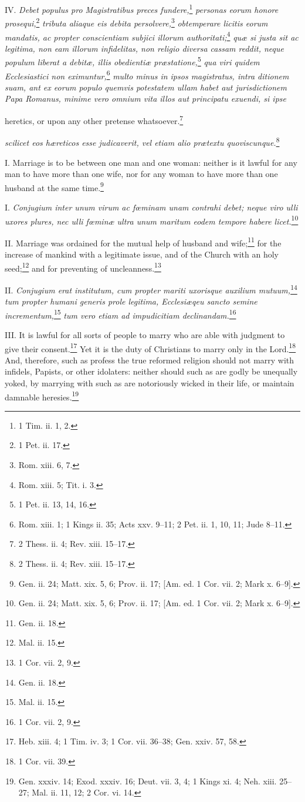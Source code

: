 IV. \emph{Debet populus pro Magistratibus preces fundere,}\footnote{1 Tim. ii. 1, 2.}\emph{ personas eorum honore prosequi,}\footnote{1 Pet. ii. 17.}\emph{ tributa aliaque eis debita persolvere,}\footnote{Rom. xiii. 6, 7.}\emph{ obtemperare licitis eorum mandatis, ac propter conscientiam subjici illorum authoritati;}\footnote{Rom. xiii. 5; Tit. i. 3.}\emph{ quæ si justa sit ac legitima, non eam illorum infidelitas, non religio diversa cassam reddit, neque populum liberat a debitæ, illis obedientiæ præstatione,}\footnote{1 Pet. ii. 13, 14, 16.}\emph{ qua viri quidem Ecclesiastici non eximuntur,}\footnote{Rom. xiii. 1; 1 Kings ii. 35; Acts xxv. 9–11; 2 Pet. ii. 1, 10, 11; Jude 8–11.}\emph{ multo minus in ipsos magistratus, intra ditionem suam, ant ex eorum populo quemvis potestatem ullam habet aut jurisdictionem Papa Romanus, minime vero omnium vita illos aut principatu exuendi, si ipse }

heretics, or upon any other pretense whatsoever.\footnote{2 Thess. ii. 4; Rev. xiii. 15–17.}

\emph{scilicet eos hæreticos esse judicaverit, vel etiam alio prætextu quoviscunque.}\footnote{2 Thess. ii. 4; Rev. xiii. 15–17.}


I. Marriage is to be between one man and one woman: neither is it lawful for any man to have more than one wife, nor for any woman to have more than one husband at the same time.\footnote{Gen. ii. 24; Matt. xix. 5, 6; Prov. ii. 17; [Am. ed. 1 Cor. vii. 2; Mark x. 6–9].}

I. \emph{Conjugium inter unum virum ac fœminam unam contrahi debet; neque viro ulli uxores plures, nec ulli fœminæ ultra unum maritum eodem tempore habere licet.}\footnote{Gen. ii. 24; Matt. xix. 5, 6; Prov. ii. 17; [Am. ed. 1 Cor. vii. 2; Mark x. 6–9].}

II. Marriage was ordained for the mutual help of husband and wife;\footnote{Gen. ii. 18.} for the increase of mankind with a legitimate issue, and of the Church with an holy seed;\footnote{Mal. ii. 15.} and for preventing of uncleanness.\footnote{1 Cor. vii. 2, 9.}

II. \emph{Conjugium erat institutum, cum propter mariti uxorisque auxilium mutuum,}\footnote{Gen. ii. 18.}\emph{ tum propter humani generis prole legitima, Ecclesiæqeu sancto semine incrementum,}\footnote{Mal. ii. 15.}\emph{ tum vero etiam ad impudicitiam declinandam.}\footnote{1 Cor. vii. 2, 9.}

III. It is lawful for all sorts of people to marry who are able with judgment to give their consent.\footnote{Heb. xiii. 4; 1 Tim. iv. 3; 1 Cor. vii. 36–38; Gen. xxiv. 57, 58.} Yet it is the duty of Christians to marry only in the Lord.\footnote{1 Cor. vii. 39.} And, therefore, such as profess the true reformed religion should not marry with infidels, Papists, or other idolaters: neither should such as are godly be unequally yoked, by marrying with such as are notoriously wicked in their life, or maintain damnable heresies.\footnote{Gen. xxxiv. 14; Exod. xxxiv. 16; Deut. vii. 3, 4; 1 Kings xi. 4; Neh. xiii. 25–27; Mal. ii. 11, 12; 2 Cor. vi. 14.}

